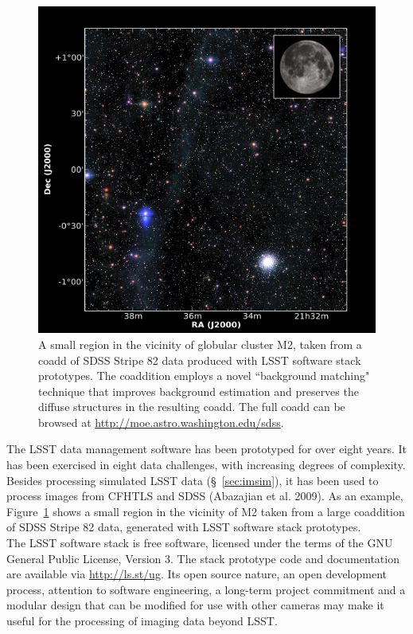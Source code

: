 \documentclass{emulateapj}
\begin{document}
\begin{figure}
%
%
\includegraphics[width=1.0\hsize,clip]{DMStripe82.jpg}
\caption{
A small region in the vicinity of globular cluster M2, taken from a coadd of SDSS Stripe 82 data produced with LSST software stack prototypes. The coaddition employs a novel ``background matching" technique that improves background estimation and preserves the diffuse structures in the resulting coadd. The full coadd can be browsed at \url{http://moe.astro.washington.edu/sdss}.} 
\label{Fig:DMStripe82}
\end{figure}


The LSST data management software has been prototyped for over eight
years. It has been exercised in eight data challenges, with increasing
degrees of complexity. Besides processing simulated LSST data
(\S~\ref{sec:imsim}), it has been used to process images from CFHTLS
and SDSS (Abazajian et al. 2009). As an example,
Figure~\ref{Fig:DMStripe82} shows a small region in the vicinity of M2
taken from a large coaddition of SDSS Stripe 82 data, generated with LSST
software stack prototypes. 
\\

The LSST software stack is free software, licensed under the terms of the GNU General
Public License, Version 3. The stack
prototype code and documentation are available via \url{http://ls.st/ug}.
Its open source nature, an open development
process, attention to software engineering, a long-term project
commitment and a modular design that can be modified for use with
other cameras 
may make it useful for the processing of imaging data beyond LSST.  
\end{document}
